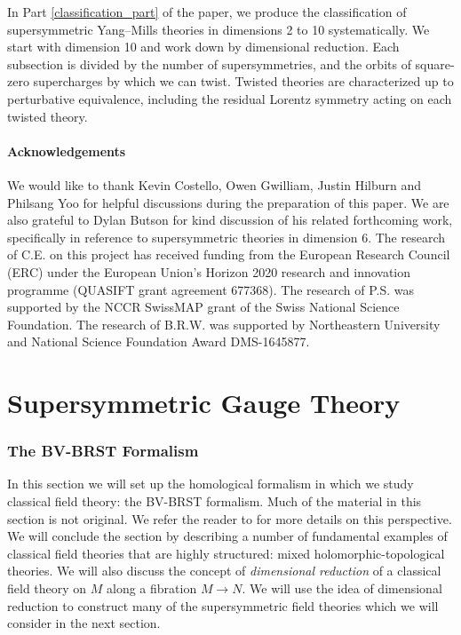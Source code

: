\documentclass[10pt, oneside]{article}
\begin{document}
In Part \ref{classification_part} of the paper, we produce the classification of supersymmetric Yang--Mills theories in dimensions 2 to 10 systematically.  We start with dimension 10 and work down by dimensional reduction.  Each subsection is divided by the number of supersymmetries, and the orbits of square-zero supercharges by which we can twist.  Twisted theories are characterized up to perturbative equivalence, including the residual Lorentz symmetry acting on each twisted theory.

\subsection*{Acknowledgements}
We would like to thank Kevin Costello, Owen Gwilliam, Justin Hilburn and Philsang Yoo for helpful discussions during the preparation of this paper.  
We are also grateful to Dylan Butson for kind discussion of his related forthcoming work, specifically in reference to supersymmetric theories in dimension $6$.  
The research of C.E. on this project has received funding from the European Research Council (ERC) under the European Union's Horizon 2020 research and innovation programme (QUASIFT grant agreement 677368).
The research of P.S. was supported by the NCCR SwissMAP grant of the Swiss National Science Foundation.
The research of B.R.W. was supported by Northeastern University and National Science Foundation Award DMS-1645877.

\pagestyle{standard}
\part{Supersymmetric Gauge Theory} \label{formalism_part}

\section{The BV-BRST Formalism} \label{BV_section}

In this section we will set up the homological formalism in which we study classical field theory: the BV-BRST formalism.  Much of the material in this section is not original.  We refer the reader to \cite{CostelloBook, Book2} for more details on this perspective.  We will conclude the section by describing a number of fundamental examples of classical field theories that are highly structured: mixed holomorphic-topological theories.  We will also discuss the concept of \emph{dimensional reduction} of a classical field theory on $M$ along a fibration $M \to N$.  We will use the idea of dimensional reduction to construct many of the supersymmetric field theories which we will consider in the next section.  
\end{document}
